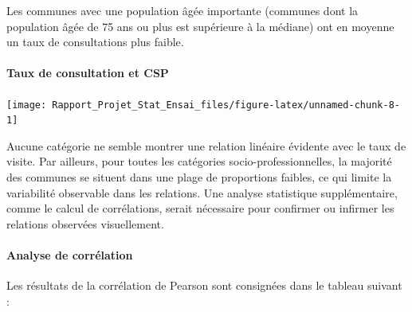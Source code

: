 \documentclass[
]{article}
\begin{document}
Les communes avec une population âgée importante (communes dont la
population âgée de 75 ans ou plus est supérieure à la médiane) ont en
moyenne un taux de consultations plus faible.

\paragraph{Taux de consultation et
CSP}\label{taux-de-consultation-et-csp}

\begin{center}\texttt{[image: Rapport\_Projet\_Stat\_Ensai\_files/figure-latex/unnamed-chunk-8-1]} \end{center}

Aucune catégorie ne semble montrer une relation linéaire évidente avec
le taux de visite. Par ailleurs, pour toutes les catégories
socio-professionnelles, la majorité des communes se situent dans une
plage de proportions faibles, ce qui limite la variabilité observable
dans les relations. Une analyse statistique supplémentaire, comme le
calcul de corrélations, serait nécessaire pour confirmer ou infirmer les
relations observées visuellement.

\paragraph{Analyse de corrélation}\label{analyse-de-corruxe9lation}

Les résultats de la corrélation de Pearson sont consignées dans le
tableau suivant :
\end{document}
